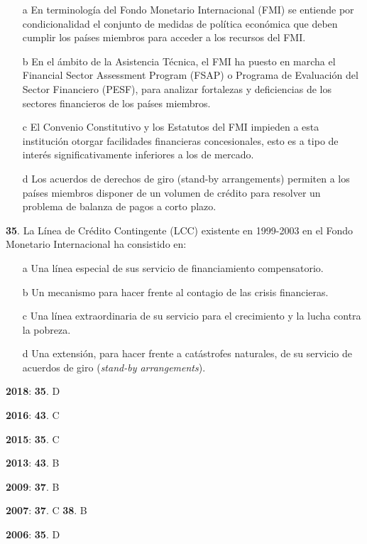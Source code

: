 \documentclass{nuevotema}
\begin{document}
\begin{enumerate}
	\item[a] En terminología del Fondo Monetario Internacional (FMI) se entiende por condicionalidad el conjunto de medidas de política económica que deben cumplir los países miembros para acceder a los recursos del FMI.
	\item[b] En el ámbito de la Asistencia Técnica, el FMI ha puesto en marcha el Financial Sector Assessment Program (FSAP) o Programa de Evaluación del Sector Financiero (PESF), para analizar fortalezas y deficiencias de los sectores financieros de los países miembros.
	\item[c] El Convenio Constitutivo y los Estatutos del FMI impieden a esta institución otorgar facilidades financieras concesionales, esto es a tipo de interés significativamente inferiores a los de mercado.
	\item[d] Los acuerdos de derechos de giro (stand-by arrangements) permiten a los países miembros disponer de un volumen de crédito para resolver un problema de balanza de pagos a corto plazo.
\end{enumerate}

\textbf{35}. La Línea de Crédito Contingente (LCC) existente en 1999-2003 en el Fondo Monetario Internacional ha consistido en:

\begin{enumerate}
	\item[a] Una línea especial de sus servicio de financiamiento compensatorio.
	\item[b] Un mecanismo para hacer frente al contagio de las crisis financieras.
	\item[c] Una línea extraordinaria de su servicio para el crecimiento y la lucha contra la pobreza.
	\item[d] Una extensión, para hacer frente a catástrofes naturales, de su servicio de acuerdos de giro (\textit{stand-by arrangements}).
\end{enumerate}

\notas

\textbf{2018}: \textbf{35}. D

\textbf{2016}: \textbf{43}. C

\textbf{2015}: \textbf{35}. C

\textbf{2013}: \textbf{43}. B

\textbf{2009}: \textbf{37}. B

\textbf{2007}: \textbf{37}. C \textbf{38}. B

\textbf{2006}: \textbf{35}. D
\end{document}
